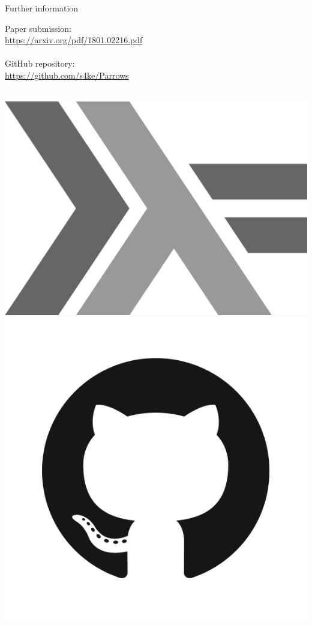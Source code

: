 \begin{frame}[fragile]{Further information}
	\begin{minipage}{0.6\textwidth}
	Paper submission:\\
	\url{https://arxiv.org/pdf/1801.02216.pdf}\\~\\
	GitHub repository:\\
	\url{https://github.com/s4ke/Parrows}\\~\\
	\end{minipage}
	\hfill
	\begin{minipage}{0.3\textwidth}
		\begin{center}
			\vspace{0.5cm}
			\includegraphics[scale=0.025]{images/haskell-logo}\\
			\vspace{0.3cm}
			\includegraphics[scale=0.1]{images/GitHub-Mark}\\
		\end{center}
		\vfill
	\end{minipage}	
\end{frame}
